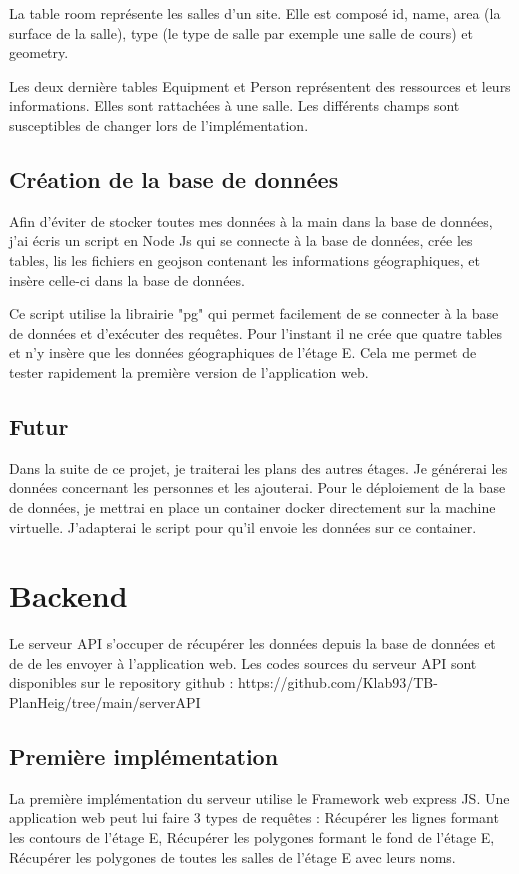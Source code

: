 \documentclass[
    iai, %
    il, %
]{heig-tb}
\begin{document}
La table room représente les salles d'un site.
Elle est composé id, name, area (la surface de la salle), type (le type de salle par exemple une salle de cours) et geometry.

Les deux dernière tables Equipment et Person représentent des ressources et leurs informations. Elles sont rattachées à une salle.
Les différents champs sont susceptibles de changer lors de l'implémentation.

\section{Création de la base de données}
Afin d'éviter de stocker toutes mes données à la main dans la base de données,
j'ai écris un script en Node Js qui se connecte à la base de données, crée les tables,
lis les fichiers en geojson contenant les informations géographiques,
et insère celle-ci dans la base de données.

Ce script utilise la librairie "pg" qui permet facilement de se connecter à la base de données et d'exécuter des requêtes.
Pour l'instant il ne crée que quatre tables et n'y insère que les données géographiques de l'étage E.
Cela me permet de tester rapidement la première version de l'application web.

\section{Futur}
Dans la suite de ce projet, je traiterai les plans des autres étages.
Je générerai les données concernant les personnes et les ajouterai.
Pour le déploiement de la base de données, je mettrai en place un container docker directement sur la machine virtuelle.
J'adapterai le script pour qu'il envoie les données sur ce container.

\chapter{Backend }
Le serveur API s'occuper de récupérer les données depuis la base de données et de de les envoyer à l'application web.
Les codes sources du serveur API sont disponibles sur le repository github : https://github.com/Klab93/TB-PlanHeig/tree/main/serverAPI

\section{Première implémentation}
La première implémentation du serveur utilise le Framework web express JS.
Une application web peut lui faire 3 types de requêtes :
Récupérer les lignes formant les contours de l'étage E,
Récupérer les polygones formant le fond de l'étage E,
Récupérer les polygones de toutes les salles de l'étage E avec leurs noms.
\end{document}
